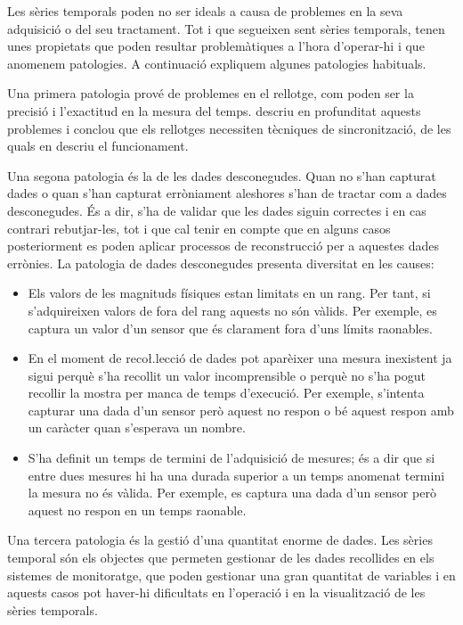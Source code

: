 Les sèries temporals poden no ser ideals a causa de problemes en la
seva adquisició o del seu tractament. Tot i que segueixen sent sèries
temporals, tenen unes propietats que poden resultar problemàtiques a
l'hora d'operar-hi i que anomenem patologies. A continuació expliquem
algunes patologies habituals.



Una primera patologia prové de problemes en el rellotge, com poden ser
la precisió i l'exactitud en la mesura del
temps. \textcite[cap.~3]{kopetz11:realtime} descriu en profunditat
aquests problemes i conclou que els rellotges necessiten tècniques de
sincronització, de les quals en descriu el funcionament.



Una segona patologia és la de les dades desconegudes. Quan no s'han
capturat dades o quan s'han capturat erròniament aleshores s'han de
tractar com a dades desconegudes. És a dir, s'ha de validar que les
dades siguin correctes i en cas contrari rebutjar-les, tot i que cal
tenir en compte que en alguns casos posteriorment es poden aplicar
processos de reconstrucció per a aquestes dades errònies.  La
patologia de dades desconegudes presenta diversitat en les causes:
\begin{itemize}

\item Els valors de les magnituds físiques estan limitats en un
  rang. Per tant, si s'adquireixen valors de fora del rang aquests no
  són vàlids. Per exemple, es captura un valor d'un sensor que és
  clarament fora d'uns límits raonables.

\item En el moment de reco\l.lecció de dades pot aparèixer una mesura
  inexistent ja sigui perquè s'ha recollit un valor incomprensible o
  perquè no s'ha pogut recollir la mostra per manca de temps
  d'execució. Per exemple, s'intenta capturar una dada d'un sensor
  però aquest no respon o bé aquest respon amb un caràcter quan
  s'esperava un nombre.

\item S'ha definit un temps de termini de l'adquisició de mesures; és
  a dir que si entre dues mesures hi ha una durada superior a un temps
  anomenat termini la mesura no és vàlida. Per exemple, es captura una
  dada d'un sensor però aquest no respon en un temps raonable.
\end{itemize}


Una tercera patologia és la gestió d’una quantitat enorme de dades.
Les sèries temporal són els objectes que permeten gestionar de les
dades recollides en els sistemes de monitoratge, que poden gestionar
una gran quantitat de variables i en aquests casos pot haver-hi
dificultats en l'operació i en la visualització de les sèries
temporals.


